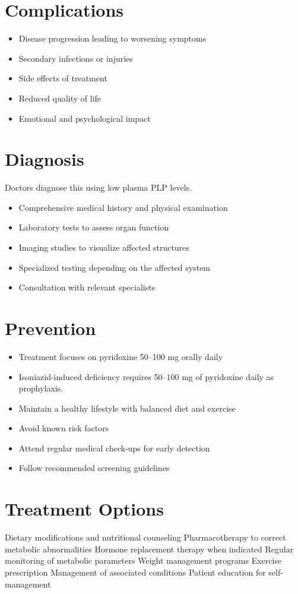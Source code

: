 \section{Complications}
\begin{itemize}[noitemsep]
  \item Disease progression leading to worsening symptoms
  \item Secondary infections or injuries
  \item Side effects of treatment
  \item Reduced quality of life
  \item Emotional and psychological impact
\end{itemize}
\section{Diagnosis}
Doctors diagnose this using low plasma PLP levels.

\begin{itemize}[noitemsep]
  \item Comprehensive medical history and physical examination
  \item Laboratory tests to assess organ function
  \item Imaging studies to visualize affected structures
  \item Specialized testing depending on the affected system
  \item Consultation with relevant specialists
\end{itemize}
\section{Prevention}
\begin{itemize}[noitemsep]
  \item Treatment focuses on pyridoxine 50--100 mg orally daily
  \item Isoniazid-induced deficiency requires 50--100 mg of pyridoxine daily as prophylaxis.
  \item Maintain a healthy lifestyle with balanced diet and exercise
  \item Avoid known risk factors
  \item Attend regular medical check-ups for early detection
  \item Follow recommended screening guidelines
\end{itemize}
\section{Treatment Options}
Dietary modifications and nutritional counseling Pharmacotherapy to correct metabolic abnormalities Hormone replacement therapy when indicated Regular monitoring of metabolic parameters Weight management programs Exercise prescription Management of associated conditions Patient education for self-management

